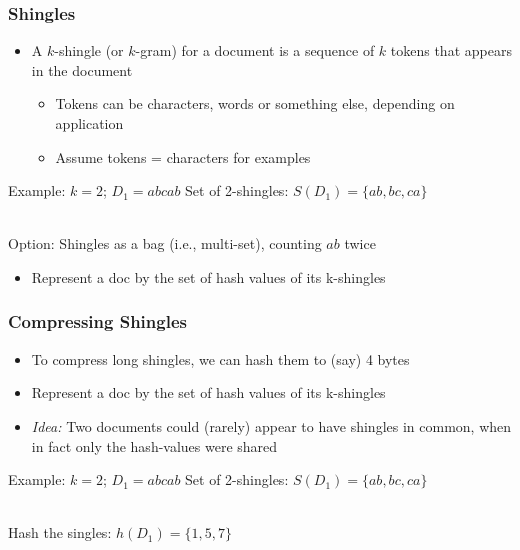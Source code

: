 \documentclass[svgnames]{beamer}
\begin{document}
\begin{frame} \frametitle{Shingles}

\begin{itemize}
\item A $k$-shingle (or $k$-gram) for a document is a sequence of $k$ tokens that appears in the document
  \begin{itemize}
  \item Tokens can be characters, words or something else, depending on application
  \item Assume tokens = characters for examples
  \end{itemize}
\end{itemize}

\begin{block}{Example: $k=2$; $D_1=abcab$}
  Set of 2-shingles: $S(D_1)=\{ab, bc, ca\}$
  
  ~\\
  Option: Shingles as a bag (i.e., multi-set), counting $ab$ twice
\end{block}
\begin{itemize}
\item Represent a doc by the set of hash values of its k-shingles
\end{itemize}

\end{frame}

  
\begin{frame} \frametitle{Compressing Shingles}

\begin{itemize}
\item To compress long shingles, we can hash them to (say) 4 bytes

\item Represent a doc by the set of hash values of its k-shingles

\item \emph{Idea:} Two documents could (rarely) appear to have shingles in common, when in fact only the hash-values were shared
\end{itemize}

\begin{block}{Example: $k=2$; $D_1=abcab$}
  Set of 2-shingles: $S(D_1)=\{ab, bc, ca\}$
  
  ~\\
  Hash the singles: $h(D_1)=\{1, 5, 7\}$
\end{block}
\end{frame}
\end{document}
